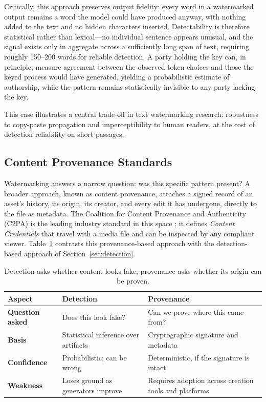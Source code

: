 \documentclass[a4paper,12pt]{article}
\begin{document}
Critically, this approach preserves output fidelity: every word in a watermarked output remains a word the model could have 
produced anyway, with nothing added to the text and no hidden characters inserted. Detectability is therefore statistical 
rather than lexical---no individual sentence appears unusual, and the signal exists only in aggregate across a sufficiently 
long span of text, requiring roughly 150--200 words for reliable detection. A party holding the key can, in principle, measure 
agreement between the observed token choices and those the keyed process would have generated, yielding a probabilistic estimate 
of authorship, while the pattern remains statistically invisible to any party lacking the key.


This case illustrates a central trade-off in text watermarking research: robustness to copy-paste propagation and imperceptibility 
to human readers, at the cost of detection reliability on short passages.
\subsection{Content Provenance Standards}
\label{subsec:c2pa}

Watermarking answers a narrow question: was this specific pattern present? A broader approach, known as content provenance, attaches a signed record of an asset's history, its origin, its creator, and every edit it has undergone, directly to the file as metadata. The Coalition for Content Provenance and Authenticity (C2PA) is the leading industry standard in this space \cite{c2pa}; it defines \textit{Content Credentials} that travel with a media file and can be inspected by any compliant viewer. Table~\ref{tab:detection-vs-provenance} contrasts this provenance-based approach with the detection-based approach of Section~\ref{sec:detection}.

\begin{table}[H]
    \centering
    \renewcommand{\arraystretch}{1.3}
    \begin{tabular}{@{} >{\raggedright\arraybackslash}p{3.5cm} >{\raggedright\arraybackslash}p{6.0cm} >{\raggedright\arraybackslash}p{6.0cm} @{}}
        \toprule
        \rowcolor{gray!15}
        \textbf{Aspect} & \textbf{Detection} & \textbf{Provenance} \\
        \midrule
        \textbf{Question asked} & Does this look fake? & Can we prove where this came from? \\
        \midrule
        \textbf{Basis} & Statistical inference over artifacts & Cryptographic signature and metadata \\
        \midrule
        \textbf{Confidence} & Probabilistic; can be wrong & Deterministic, if the signature is intact \\
        \midrule
        \textbf{Weakness} & Loses ground as generators improve & Requires adoption across creation tools and platforms \\
        \bottomrule
    \end{tabular}
    \caption{Detection asks whether content looks fake; provenance asks whether its origin can be proven.}
    \label{tab:detection-vs-provenance}
\end{table}
\end{document}
